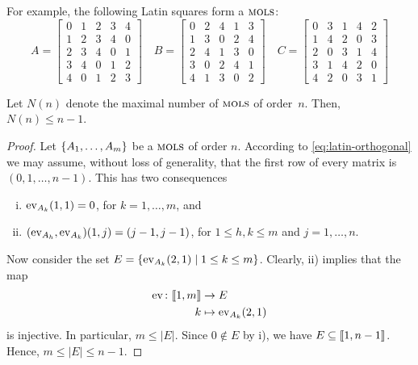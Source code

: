 \begin{xmpl}{}
    For example, the following Latin squares form a $\operatorname{\textsc{mols}}$:
    \[
        A =
        \begin{bmatrix}
        0 & 1 & 2 & 3 & 4 \\
        1 & 2 & 3 & 4 & 0 \\
        2 & 3 & 4 & 0 & 1 \\
        3 & 4 & 0 & 1 & 2 \\
        4 & 0 & 1 & 2 & 3
        \end{bmatrix}
        \quad
        B =
        \begin{bmatrix}
        0 & 2 & 4 & 1 & 3 \\
        1 & 3 & 0 & 2 & 4 \\
        2 & 4 & 1 & 3 & 0 \\
        3 & 0 & 2 & 4 & 1 \\
        4 & 1 & 3 & 0 & 2
        \end{bmatrix}
        \quad
        C =
        \begin{bmatrix}
        0 & 3 & 1 & 4 & 2 \\
        1 & 4 & 2 & 0 & 3 \\
        2 & 0 & 3 & 1 & 4 \\
        3 & 1 & 4 & 2 & 0 \\
        4 & 2 & 0 & 3 & 1
        \end{bmatrix}
    \]
\end{xmpl}

\begin{prop}
    Let\/ $N(n)$ denote the maximal number of\/ $\operatorname{\textsc{mols}}$ of order\/~$n$. Then, $N(n)\le n-1$.
\end{prop}

\begin{proof}
    Let $\{A_1,\dots,A_m\}$ be a $\operatorname{\textsc{mols}}$ of order $n$. According to \eqref{eq:latin-orthogonal} we may assume, without loss of generality, that the first row of every matrix is $(0,1,\dots,n-1)$. This has two consequences
    \begin{enumerate}[i)]
        \item ${\rm ev}_{A_k}(1,1)=0$, for $k=1,\dots,m$, and
        \item $({\rm ev}_{A_h},{\rm ev}_{A_k})(1,j)=(j-1,j-1)$, for $1\le h,k\le m$ and $j=1,\dots,n$. 
    \end{enumerate}
    Now consider the set $E=\{{\rm ev}_{A_k}(2,1)\mid 1\le k\le m\}$. Clearly, ii) implies that the map
    \begin{align}\label{map:eval-21}
        {\rm ev}_{}\colon\llbracket1,m\rrbracket&\to E\\
        k&\mapsto{\rm ev}_{A_k}(2,1)\nonumber
    \end{align}
    is injective. In particular, $m\le|E|$. Since $0\notin E$ by i), we have $E\subseteq\llbracket1,n-1\rrbracket$. Hence, $m\le|E|\le n-1$.

\end{proof}

